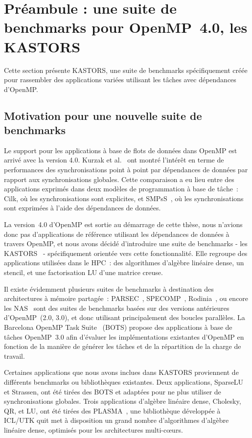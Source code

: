 \section{Préambule : une suite de benchmarks pour OpenMP~4.0, les KASTORS}\label{sec:openmp:kastors}

Cette section présente KASTORS, une suite de benchmarks spécifiquement créée pour rassembler des applications variées utilisant les tâches avec dépendances d'OpenMP.

\subsection{Motivation pour une nouvelle suite de benchmarks}

Le support pour les applications à base de flots de données dans OpenMP est arrivé avec la version 4.0.
Kurzak et al.~\cite{Kurzak2010} ont montré l'intérêt en terme de performances des synchronisations point à point par dépendances de données par rapport aux synchronisations globales.
Cette comparaison a eu lieu entre des applications exprimés dans deux modèles de programmation à base de tâche~: Cilk, où les synchronisations sont explicites, et SMPsS~\cite{BSC2008}, où les synchronisations sont exprimées à l'aide des dépendances de données.

La version~4.0 d'OpenMP est sortie au démarrage de cette thèse, nous n'avions donc pas d'applications de référence utilisant les dépendances de données à travers OpenMP, et nous avons décidé d'introduire une suite de benchmarks - les KASTORS~\cite{Virouleau2014} - spécifiquement orientée vers cette fonctionnalité.
Elle regroupe des applications utilisées dans le HPC~: des algorithmes d'algèbre linéaire dense, un stencil, et une factorisation LU d'une matrice creuse.

Il existe évidemment plusieurs suites de benchmarks à destination des architectures à mémoire partagée~: PARSEC~\cite{Bienia2008}, SPECOMP~\cite{Aslot2001}, Rodinia~\cite{Rodinia2010}, ou encore les NAS~\cite{Bailey1994} sont des suites de benchmarks basées sur des versions antérieures d'OpenMP~(2.0, 3.0), et donc utilisant principalement des boucles parallèles.
La Barcelona OpenMP Task Suite~\cite{Duran2009} (BOTS) propose des applications à base de tâches OpenMP~3.0 afin d'évaluer les implémentations existantes d'OpenMP en fonction de la manière de générer les tâches et de la répartition de la charge de travail.

Certaines applications que nous avons inclues dans KASTORS proviennent de différents benchmarks ou bibliothèques existantes.
Deux applications, SparseLU et Strassen, ont été tirées des BOTS et adaptées pour ne plus utiliser de synchronisations globales.
Trois applications d'algèbre linéaire dense, Cholesky, QR, et LU, ont été tirées des PLASMA~\cite{Kurzak2013}, une bibliothèque développée à ICL/UTK quit met à disposition un grand nombre d'algorithmes d'algèbre linéaire dense, optimisés pour les architectures multi-cœurs.

